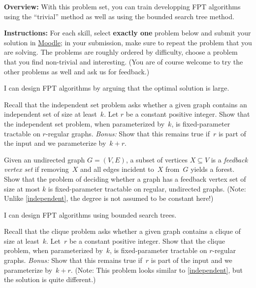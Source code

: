 \documentclass[english]{uebung_cs}
\begin{document}
\textbf{Overview:} With this problem set, you can train developping FPT algorithms using the \enquote{trivial} method as well as using the bounded search tree method.

\textbf{Instructions:} For each skill, select \textbf{exactly one} problem below and submit your solution in \href{https://moodle.studiumdigitale.uni-frankfurt.de/moodle/course/view.php?id=6259}{Moodle}; in your submission, make sure to repeat the problem that you are solving.
The problems are roughly ordered by difficulty, choose a problem that you find non-trivial and interesting. (You are of course welcome to try the other problems as well and ask us for feedback.)


\begin{skill}
  I can design FPT algorithms by arguing that the optimal solution is large.
\end{skill}

\begin{exercise}\label{independent}
  Recall that the independent set problem asks whether a given graph contains an independent set of size at least~$k$.
  Let $r$ be a constant positive integer.
  Show that the independent set problem, when parameterized by~$k$, is fixed-parameter tractable on $r$-regular graphs.
  \emph{Bonus:} Show that this remains true if~$r$ is part of the input and we parameterize by~$k+r$.
\end{exercise}

\begin{exercise}
  Given an undirected graph $G = (V, E)$, a subset of vertices $X \subseteq V$ is a \emph{feedback vertex
  set} if removing~$X$ and all edges incident to~$X$ from~$G$ yields a forest. Show that the problem of deciding
  whether a graph has a feedback vertex set of size at most $k$ is fixed-parameter tractable on regular,
  undirected graphs. (Note: Unlike \ref{independent}, the degree is not assumed to be constant here!)
\end{exercise}


\begin{skill}
  I can design FPT algorithms using bounded search trees.
\end{skill}

  \begin{exercise}\label{clique}
    Recall that the clique problem asks whether a given graph contains a clique of size at least~$k$.
    Let~$r$ be a constant positive integer.
    Show that the clique problem, when parameterized by~$k$, is fixed-parameter tractable on $r$-regular graphs.
    \emph{Bonus:} Show that this remains true if~$r$ is part of the input and we parameterize by~$k+r$. (Note: This problem looks similar to \ref{independent}, but the solution is quite different.)
  \end{exercise}
\end{document}
